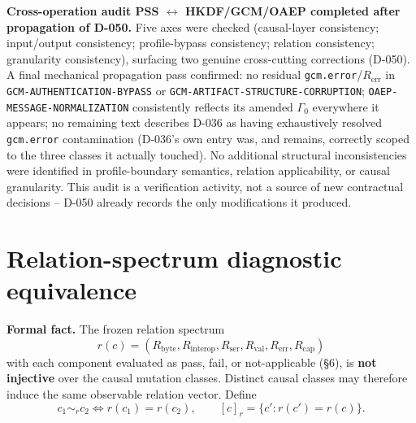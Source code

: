 \documentclass[11pt,a4paper]{article}
\begin{document}
\textbf{Cross-operation audit PSS $\leftrightarrow$ HKDF/GCM/OAEP completed after propagation of D-050.} Five axes were checked (causal-layer consistency; input/output consistency; profile-bypass consistency; relation consistency; granularity consistency), surfacing two genuine cross-cutting corrections (D-050). A final mechanical propagation pass confirmed: no residual \texttt{gcm.error}/$R_{\text{err}}$ in \texttt{GCM-AUTHENTICATION-BYPASS} or \texttt{GCM-ARTIFACT-STRUCTURE-CORRUPTION}; \texttt{OAEP-MESSAGE-NORMALIZATION} consistently reflects its amended $\Gamma_0$ everywhere it appears; no remaining text describes D-036 as having exhaustively resolved \texttt{gcm.error} contamination (D-036's own entry was, and remains, correctly scoped to the three classes it actually touched). No additional structural inconsistencies were identified in profile-boundary semantics, relation applicability, or causal granularity. This audit is a verification activity, not a source of new contractual decisions -- D-050 already records the only modifications it produced.

\section{Relation-spectrum diagnostic equivalence}\label{sec:diagnostic-equivalence}
\textbf{Formal fact.} The frozen relation spectrum
\[r(c) = (R_{\text{byte}}, R_{\text{interop}}, R_{\text{ser}}, R_{\text{val}}, R_{\text{err}}, R_{\text{cap}})\]
with each component evaluated as pass, fail, or not-applicable (\S6), is \textbf{not injective} over the causal mutation classes. Distinct causal classes may therefore induce the same observable relation vector. Define
\[c_1 \sim_r c_2 \iff r(c_1) = r(c_2), \qquad [c]_r = \{c' : r(c') = r(c)\}.\]
\end{document}
